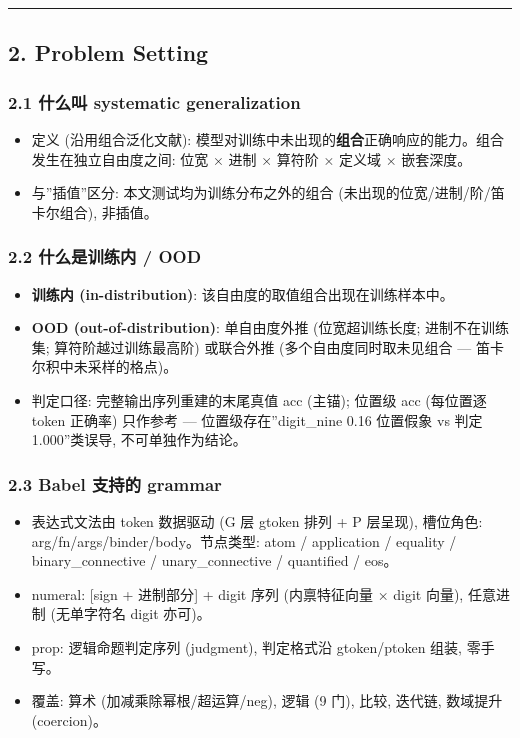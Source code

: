 \documentclass[
]{article}
\providecommand{\tightlist}{%
  \setlength{\itemsep}{0pt}\setlength{\parskip}{0pt}}
\begin{document}
\begin{center}\rule{0.5\linewidth}{0.5pt}\end{center}

\subsection{2. Problem Setting}\label{problem-setting}

\subsubsection{2.1 什么叫 systematic
generalization}\label{ux4ec0ux4e48ux53eb-systematic-generalization}

\begin{itemize}
\tightlist
\item
  定义 (沿用组合泛化文献):
  模型对训练中未出现的\textbf{组合}正确响应的能力。组合发生在独立自由度之间:
  位宽 × 进制 × 算符阶 × 定义域 × 嵌套深度。
\item
  与''插值''区分: 本文测试均为训练分布之外的组合
  (未出现的位宽/进制/阶/笛卡尔组合), 非插值。
\end{itemize}

\subsubsection{2.2 什么是训练内 /
OOD}\label{ux4ec0ux4e48ux662fux8badux7ec3ux5185-ood}

\begin{itemize}
\tightlist
\item
  \textbf{训练内 (in-distribution)}:
  该自由度的取值组合出现在训练样本中。
\item
  \textbf{OOD (out-of-distribution)}: 单自由度外推 (位宽超训练长度;
  进制不在训练集; 算符阶越过训练最高阶) 或联合外推
  (多个自由度同时取未见组合 --- 笛卡尔积中未采样的格点)。
\item
  判定口径: 完整输出序列重建的末尾真值 acc (主锚); 位置级 acc (每位置逐
  token 正确率) 只作参考 --- 位置级存在''digit\_nine 0.16 位置假象 vs
  判定 1.000''类误导, 不可单独作为结论。
\end{itemize}

\subsubsection{2.3 Babel 支持的
grammar}\label{babel-ux652fux6301ux7684-grammar}

\begin{itemize}
\tightlist
\item
  表达式文法由 token 数据驱动 (G 层 gtoken 排列 + P 层呈现), 槽位角色:
  arg/fn/args/binder/body。节点类型: atom / application / equality /
  binary\_connective / unary\_connective / quantified / eos。
\item
  numeral: {[}sign + 进制部分{]} + digit 序列 (内禀特征向量 × digit
  向量), 任意进制 (无单字符名 digit 亦可)。
\item
  prop: 逻辑命题判定序列 (judgment), 判定格式沿 gtoken/ptoken 组装,
  零手写。
\item
  覆盖: 算术 (加减乘除幂根/超运算/neg), 逻辑 (9 门), 比较, 迭代链,
  数域提升 (coercion)。
\end{itemize}
\end{document}
